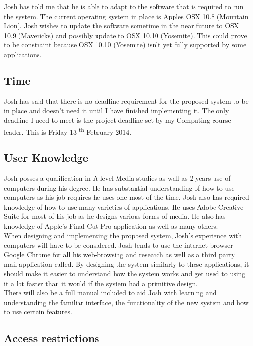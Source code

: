 Josh has told me that he is able to adapt to the software that is required to run the system. The current operating system in place is Apples OSX 10.8 (Mountain Lion). Josh wishes to update the software sometime in the near future to OSX 10.9 (Mavericks) and possibly update to OSX 10.10 (Yosemite). This could prove to be constraint because OSX 10.10 (Yosemite) isn't yet fully supported by some applications. 

\subsection{Time}

Josh has said that there is no deadline requirement for the proposed system to be in place and doesn't need it until I have finished implementing it. The only deadline I need to meet is the project deadline set by my Computing course leader. This is Friday 13 \textsuperscript{th} February 2014.

\subsection{User Knowledge}

Josh posses a qualification in A level Media studies as well as 2 years use of computers during his degree. He has substantial understanding of how to use computers as his job requires he uses one most of the time. Josh also has required knowledge of how to use many varieties of applications. He uses Adobe Creative Suite for most of his job as he designs various forms of media. He also has knowledge of Apple's Final Cut Pro application as well as many others.\\

\noindent When designing and implementing the proposed system, Josh's experience with computers will have to be considered. Josh tends to use the internet browser Google Chrome for all his web-browsing and research as well as a third party mail application called. By designing the system similarly to these applications, it should make it easier to understand how the system works and get used to using it a lot faster than it would if the system had a primitive design.\\

\noindent There will also be a full manual included to aid Josh with learning and understanding the familiar interface, the functionality of the new system and how to use certain features.

\subsection{Access restrictions}

